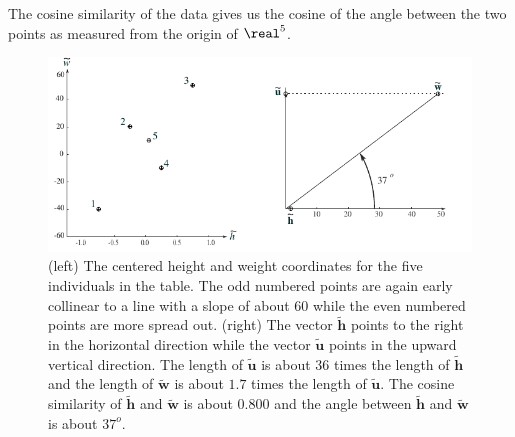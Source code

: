 The cosine similarity of the data gives us the cosine of the angle between the two points 
as measured from the origin of $\real^5$.

\begin{figure}[h]
\centering
\includegraphics[scale=1.25]{./images/heightWeight2.pdf}
\caption{(left) The centered height and weight coordinates for the five 
individuals in the table.  The odd numbered points are again early collinear to 
a line with a slope of about $60$ while the even numbered points are more 
spread out.  (right)  The vector $\widetilde{\mathbf{h}}$ points to the right 
in the horizontal direction while the vector $\widetilde{\mathbf{u}}$ points in 
the upward vertical direction.  The length of $\widetilde{\mathbf{u}}$ is about 
$36$ times the length of $\widetilde{\mathbf{h}}$ and the length of 
$\widetilde{\mathbf{w}}$ is about $1.7$ times the length of 
$\widetilde{\mathbf{u}}$.  The cosine similarity of $\widetilde{\mathbf{h}}$ 
and $\widetilde{\mathbf{w}}$ is about 0.800 and the angle between 
$\widetilde{\mathbf{h}}$ and $\widetilde{\mathbf{w}}$ is about $37^o$.} 
\label{twogeoms2}
\end{figure}
